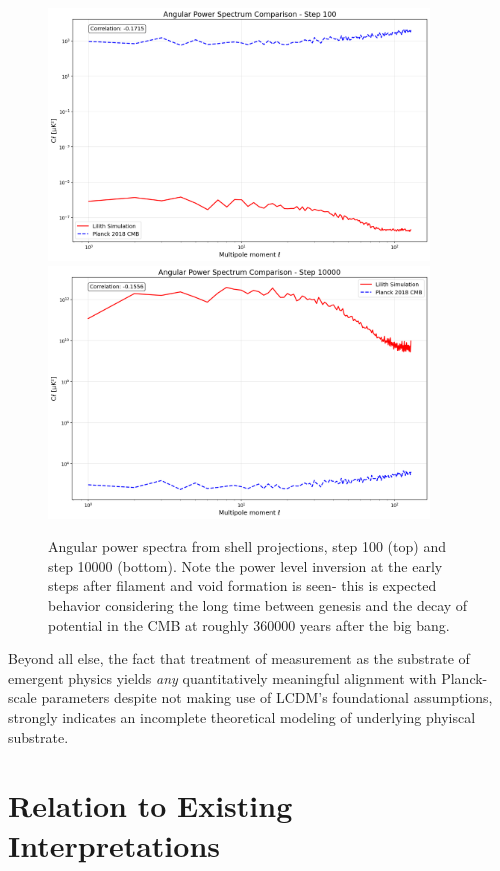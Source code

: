 \begin{figure}[ht]
  \centering
  \includegraphics[width=0.9\textwidth]{images/power_spectrum_000100.png}
  \includegraphics[width=0.9\textwidth]{images/power_spectrum_010000.png}
  \caption{Angular power spectra from shell projections, step 100 (top) and step 10000 (bottom). Note the power level inversion at the early steps after filament and void formation is seen- this is expected behavior considering the long time between genesis and the decay of potential in the CMB at roughly 360000 years after the big bang.}
\end{figure}

Beyond all else, the fact that treatment of measurement as the substrate of emergent physics yields \textit{any} quantitatively meaningful alignment with Planck-scale parameters despite not making use of LCDM's foundational assumptions, strongly indicates an incomplete theoretical modeling of underlying phyiscal substrate.  

\section*{Relation to Existing Interpretations}

